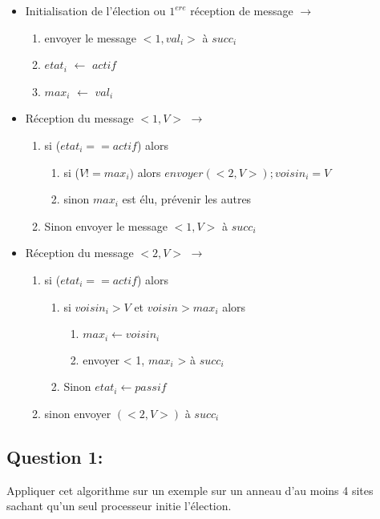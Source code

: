 \documentclass{article}
\begin{document}
\begin{itemize}[noitemsep]
    \item[] Initialisation de l'élection ou $1^{ere}$ réception de message $\rightarrow$
    \begin{enumerate}[noitemsep]
        \item envoyer le message $<1, val_i>$ à $succ_i$
        \item $etat_i$ $\leftarrow$ $actif$
        \item $max_i$ $\leftarrow$ $val_i$
    \end{enumerate}
    \item[] Réception du message $<1, V>$ $\rightarrow$
    \begin{enumerate}[noitemsep]
        \item si ($etat_i == actif$) alors
        \begin{enumerate}
            \item si ($V != max_i)$ alors $envoyer(<2, V>); voisin_i = V$
            \item sinon $max_i$ est élu, prévenir les autres
        \end{enumerate}
        \item Sinon envoyer le message $<1, V>$ à $succ_i$
    \end{enumerate}
    \item[] Réception du message $<2, V>$ $\rightarrow$
    \begin{enumerate}[noitemsep]
        \item si ($etat_i == actif$) alors
        \begin{enumerate}
            \item si $voisin_i > V$ et $voisin > max_i$ alors
            \begin{enumerate}
                \item $max_i \leftarrow voisin_i$
                \item envoyer < 1, $max_i$ > à $succ_i$
            \end{enumerate}
            \item Sinon $etat_i \leftarrow passif$
        \end{enumerate}
        \item sinon envoyer $(<2, V>)$ à $succ_i$
    \end{enumerate}
\end{itemize}

\subsection*{Question 1:} Appliquer cet algorithme sur un exemple sur un anneau d'au moins 4 sites sachant qu'un seul processeur initie l'élection.
\end{document}
